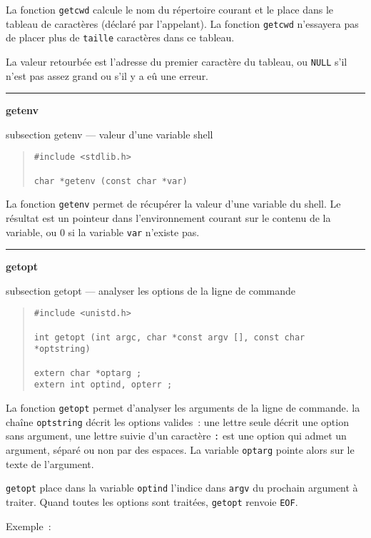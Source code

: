 \documentclass [twoside] {report}
\newcommand {\primitive} [1]
    {
	\phantomsection
	{\large \bf #1}
	\addcontentsline {toc} {subsection} {#1}
    }
\newcommand {\separation}
    {
	\vspace {5mm}
	\nopagebreak
	\hrule
    }
\begin{document}
La fonction {\tt getcwd} calcule le nom du répertoire courant et le
place dans le tableau de caractères (déclaré par l'appelant). La
fonction {\tt getcwd} n'essayera pas de placer plus de {\tt taille}
caractères dans ce tableau.

La valeur retourbée est l'adresse du premier caractère du tableau, ou
{\tt NULL} s'il n'est pas assez grand ou s'il y a eû une erreur.


\separation 
\primitive {getenv} --- valeur d'une variable shell

\begin {quote}
\begin {verbatim}
#include <stdlib.h>

char *getenv (const char *var)
\end{verbatim}
\end {quote}

La fonction {\tt getenv} permet de récupérer la valeur d'une
variable du shell. Le résultat est un pointeur
dans l'environnement courant sur le contenu de la variable,
ou 0 si la variable {\tt var}
n'existe pas.


\separation 
\primitive {getopt} --- analyser les options de la ligne de commande

\begin {quote}
\begin {verbatim}
#include <unistd.h>

int getopt (int argc, char *const argv [], const char *optstring)

extern char *optarg ;
extern int optind, opterr ;
\end{verbatim}
\end {quote}

La fonction {\tt getopt} permet d'analyser les arguments de
la ligne de commande. la chaîne {\tt optstring} décrit les
options valides~: une lettre seule décrit une option sans
argument, une lettre suivie d'un caractère {\tt :} est une
option qui admet un argument, séparé ou non par des espaces.
La variable {\tt optarg} pointe alors sur le texte de
l'argument.

{\tt getopt} place dans la variable {\tt optind} l'indice dans
{\tt argv} du prochain argument à traiter. Quand toutes les
options sont traitées, {\tt getopt} renvoie {\tt EOF}.

Exemple~:
\end{document}
